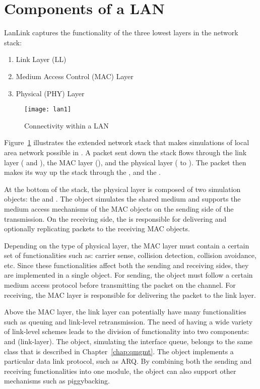 \section{Components of a LAN}
\label{sec:lan_components}

LanLink captures the functionality of the three lowest layers in the
network stack:

\begin{enumerate}
\item
	Link Layer (LL)
\item
	Medium Access Control (MAC) Layer
\item
	Physical (PHY) Layer
\end{enumerate}

\begin{figure}[tb]
  \centerline{\texttt{[image: lan1]}}
  \caption{Connectivity within a LAN}
  \label{fig:lan-connectivity}
\end{figure}


Figure~\ref{fig:lan-connectivity} illustrates the extended network
stack that makes simulations of local area network possible in \ns.  A
packet sent down the stack flows
through the link layer ( and ), the MAC layer
(), and the physical layer ( to
).  The packet then makes its way up the stack through
the , and the .

At the bottom of the stack, the physical layer is composed of two
simulation objects: the  and .  The
 object simulates the shared medium and supports the medium
access mechanisms of the MAC objects on the sending side of the
transmission.  On the receiving side, the  is
responsible for delivering and optionally replicating packets to the
receiving MAC objects.

Depending on the type of physical layer, the MAC layer must contain a
certain set of functionalities such as: carrier sense, collision
detection, collision avoidance, etc.  Since these functionalities affect
both the sending and receiving sides, they are implemented in a single
 object.  For sending, the  object must follow a certain
medium access protocol before transmitting the packet on the channel.
For receiving, the MAC layer is responsible for delivering the packet to
the link layer.

Above the MAC layer, the link layer can potentially have many
functionalities such as queuing and link-level retransmission.  The
need of having a wide variety of link-level schemes leads to the
division of functionality into two components:  and
 (link-layer).  The  object, simulating the
interface queue, belongs to the same  class that is
described in Chapter~\ref{chap:qmgmt}.  The  object implements
a particular data link protocol, such as ARQ.  By combining both the
sending and receiving functionalities into one module, the 
object can also support other mechanisms such as piggybacking.

